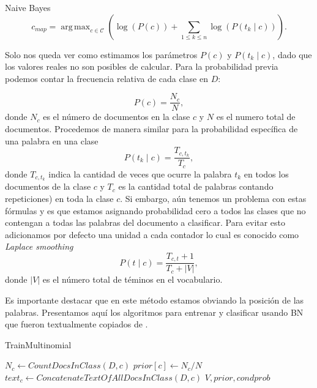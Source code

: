 \documentclass{llncs}
\DeclareMathOperator*{\argmax}{arg\,max}
\begin{document}
\begin{subsection}{Naive Bayes}
		\[
				c_{map} = \argmax_{c\in\mathcal{C}} \left( \log(P(c))  + \sum_{1\leq k\leq n} \log(P(t_k\mid c)) \right).
		\]
		
		Solo nos queda ver como estimamos los par\'ametros $P(c)$ y $P (t_k\mid c)$, dado que los valores reales no son posibles de calcular.	Para la probabilidad previa podemos contar la frecuencia relativa de cada clase en $D$:
		
		\[P(c) = \frac{ N_c }{N} , \]
		donde $N_c$ es el n\'umero de documentos en la clase $c$ y $N$ es el numero total de documentos. Procedemos de manera similar para la probabilidad espec\'ifica de una palabra en una clase
		\[
			P(t_k\mid c) =\frac{ T_{c,t_k}}{T_{c}},
		\]
		donde $T_{c,t_k}$ indica la cantidad de veces que ocurre  la palabra $t_k$ en todos los documentos de la clase $c$ y $T_{c}$ es la cantidad total de palabras contando repeticiones) en toda la clase $c$. Si embargo, a\'un tenemos un problema con estas f\'ormulas y es que estamos asignando probabilidad cero a todos las clases que no contengan a todas las palabras del documento a clasificar. Para evitar esto adicionamos por defecto una unidad a cada contador lo cual es conocido como \emph{Laplace smoothing}
		\[
			P(t\mid c) = \frac{T_{c,t} + 1}{T_c + |V|},	
		\]
		donde $|V|$ es el n\'umero total de t\'eminos en el vocabulario.
		
		 Es importante destacar que en este m\'etodo estamos obviando la posici\'on de las palabras. Presentamos aqu\'i los algoritmos para entrenar y clasificar usando BN que fueron textualmente copiados de \color{red}{2009 Manning C. D., Introduction to Information Retrieval, p\'agina 260. [No recuerdo como citar esto correctamente. Also recordar que agregue unos paquetes arriba que no se si se agragan aqui o en otro de los .tex]}\color{black}.
		 
		 
		 
		 \begin{algorithm}{}
		 			\caption{TrainMultinomial}
		 	\begin{algorithmic}[1]
		 		
		 		\State $N_c \leftarrow CountDocsInClass(D,c)$
		 		\State $prior[c] \leftarrow N_c/N$
		 		\State $text_c \leftarrow ConcatenateTextOfAllDocsInClass(D, c)$
		 		\EndFor
		 		\EndFor 
		 		\EndFor
		 		\State \textbf{\Return} $V, prior, condprob$
		 	\end{algorithmic}
		 \end{algorithm}
		 

\end{subsection}
\end{document}
